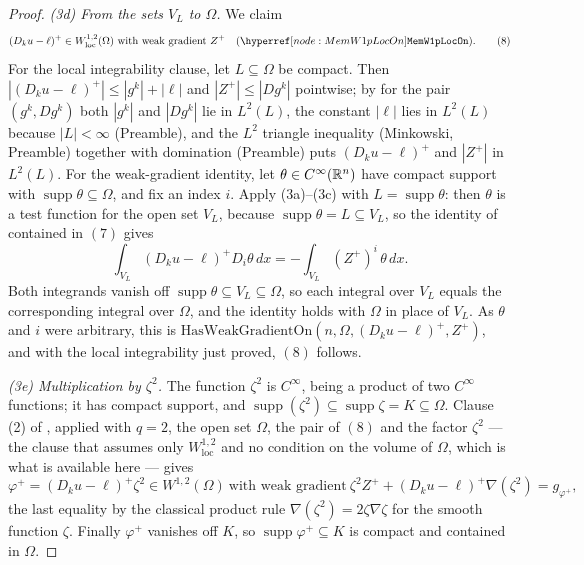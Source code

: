\begin{proof}
\emph{(3d) From the sets $V_L$ to $\Omega$.}  We claim
\[
(D_ku-\ell)^{+}\in W^{1,2}_{\mathrm{loc}}(\Omega)\ \text{with weak gradient}\ Z^{+}
\quad(\noderef{MemW1pLocOn}).
\tag{8}
\]
For the local integrability clause, let $L\subseteq\Omega$ be compact.  Then
$|(D_ku-\ell)^{+}|\le|g^k|+|\ell|$ and $|Z^{+}|\le|Dg^k|$ pointwise; by
 for the pair $(g^k,Dg^k)$ both $|g^k|$ and $|Dg^k|$ lie in
$L^2(L)$, the constant $|\ell|$ lies in $L^2(L)$ because $|L|<\infty$
(Preamble), and the $L^2$ triangle inequality (Minkowski, Preamble) together
with domination (Preamble) puts $(D_ku-\ell)^{+}$ and $|Z^{+}|$ in $L^2(L)$.
For the weak-gradient identity, let $\theta\in C^\infty(\mathbb{R}^n)$ have compact
support with $\operatorname{supp}\theta\subseteq\Omega$, and fix an index $i$.
Apply (3a)--(3c) with $L=\operatorname{supp}\theta$: then $\theta$ is a test
function for the open set $V_L$, because
$\operatorname{supp}\theta=L\subseteq V_L$, so the identity of
 contained in $(7)$ gives
\[
\int_{V_L}(D_ku-\ell)^{+}D_i\theta\,dx=-\int_{V_L}(Z^{+})^i\,\theta\,dx .
\]
Both integrands vanish off $\operatorname{supp}\theta\subseteq V_L\subseteq\Omega$,
so each integral over $V_L$ equals the corresponding integral over $\Omega$, and
the identity holds with $\Omega$ in place of $V_L$.  As $\theta$ and $i$ were
arbitrary, this is $\mathrm{HasWeakGradientOn}(n,\Omega,(D_ku-\ell)^{+},Z^{+})$,
and with the local integrability just proved, $(8)$ follows.

\emph{(3e) Multiplication by $\zeta^2$.}  The function $\zeta^2$ is $C^\infty$,
being a product of two $C^\infty$ functions; it has compact support, and
$\operatorname{supp}(\zeta^2)\subseteq\operatorname{supp}\zeta=K\subseteq\Omega$.
Clause (2) of , applied with $q=2$, the open set
$\Omega$, the pair of $(8)$ and the factor $\zeta^2$ --- the clause that assumes
only $W^{1,2}_{\mathrm{loc}}$ and no condition on the volume of $\Omega$, which
is what is available here --- gives
\[
\varphi^{+}=(D_ku-\ell)^{+}\zeta^2\in W^{1,2}(\Omega)
\ \text{with weak gradient}\
\zeta^2Z^{+}+(D_ku-\ell)^{+}\nabla(\zeta^2)=g_{\varphi^{+}} ,
\tag{9}
\]
the last equality by the classical product rule $\nabla(\zeta^2)=2\zeta\nabla\zeta$
for the smooth function $\zeta$.  Finally $\varphi^{+}$ vanishes off $K$, so
$\operatorname{supp}\varphi^{+}\subseteq K$ is compact and contained in $\Omega$.


\end{proof}
